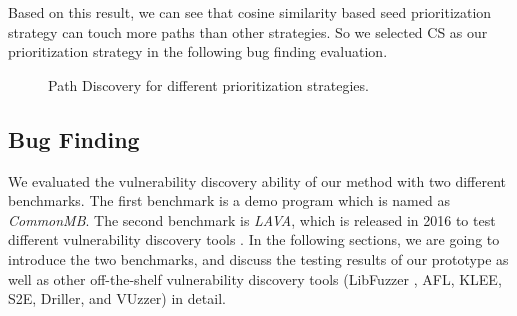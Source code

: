 Based on this result, we can see that cosine similarity based seed prioritization strategy can touch more paths than other strategies. So we selected CS as our prioritization strategy in the following bug finding evaluation.
\begin{figure}
  \caption{Path Discovery for different prioritization strategies.}
  \label{path-detail}
\end{figure} 

\subsection{Bug Finding}
We evaluated the vulnerability discovery ability of our method with two different benchmarks. The first benchmark is a demo program which is named as \emph{CommonMB}. The second benchmark is \emph{LAVA}, which is released in 2016 to test different vulnerability discovery tools \cite{dolan2016lava}. In the following sections, we are going to introduce the two benchmarks, and discuss the testing results of our prototype as well as other off-the-shelf vulnerability discovery tools (LibFuzzer \cite{libfuzzer}, AFL, KLEE, S2E, Driller, and VUzzer) in detail.

